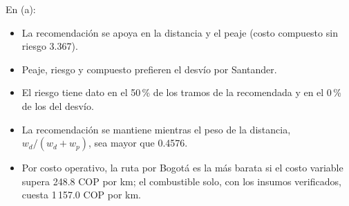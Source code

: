 En (a):
\begin{itemize}
\item La recomendación se apoya en la distancia y el peaje (costo compuesto sin riesgo 3.367).
\item Peaje, riesgo y compuesto prefieren el desvío por Santander.
\item El riesgo tiene dato en el 50\,\% de los tramos de la recomendada y en el 0\,\% de los del desvío.
\item La recomendación se mantiene mientras el peso de la distancia, $w_d/(w_d+w_p)$, sea mayor que 0.4576.
\item Por costo operativo, la ruta por Bogotá es la más barata si el costo variable supera 248.8 COP por km; el combustible solo, con los insumos verificados, cuesta 1\,157.0 COP por km.
\end{itemize}
